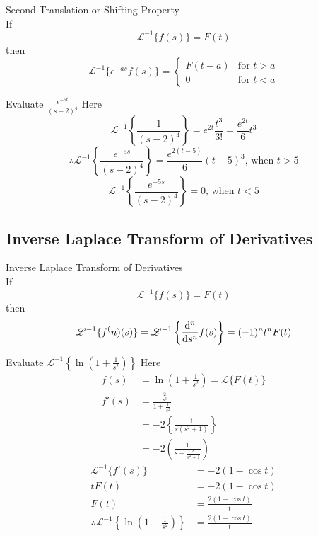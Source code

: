 \documentclass[12pt]{article}
\newcommand{\Lap}{\mathscr{L}}
\newcommand{\Lapinv}{\mathscr{L}^{-1}}
\begin{document}
\begin{theorem}{Second Translation or Shifting Property}{}
    \\If \[
        \Lapinv \{ f(s) \} = F(t)
    \] then \[
        \Lapinv \{ e^{-as}f(s) \} = 
        \begin{cases}
            F(t-a) & \text{for } t > a \\
            0 & \text{for } t < a
        \end{cases}
    \]
\end{theorem}

\begin{example}{Evaluate $\displaystyle \frac{e^{-5t}}{(s-2)^4}$}{}
    Here \[
        \Lapinv \left\{ \frac{1}{(s-2)^4} \right\} = e^{2t}\frac{t^3}{3!} = \frac{e^{2t}}{6} t^3
    \] \[
        \therefore \Lapinv \left\{ \frac{e^{-5s}}{(s-2)^4} \right\} = \frac{e^{2(t-5)}}{6} (t-5)^3 \text{, when } t > 5
    \] \[
        \Lapinv \left\{ \frac{e^{-5s}}{(s-2)^4} \right\} = 0 \text{, when } t < 5
    \]
\end{example}


\subsection{Inverse Laplace Transform of Derivatives}

\begin{theorem}{Inverse Laplace Transform of Derivatives}{}
    \\If \[
        \Lapinv \{ f(s) \} = F(t)
    \] then \[
        \Lapinv \{ f^(n)(s) \} = \Lapinv \left\{ \dv[n]{s} f(s) \right\} = (-1)^n t^n F(t)
    \]
\end{theorem}

\begin{example}{Evaluate $\displaystyle \Lapinv \left\{ \ln{\left( 1+\frac{1}{s^2} \right) } \right\}$}{}
    Here
    \begin{align*}
        f(s) &= \ln{\left( 1 + \frac{1}{s^2} \right) } = \Lap \{ F(t) \} \\
        f'(s) &= \frac{-\frac{2}{s^3}}{1+\frac{1}{s^2}} \\
        &= -2 \left\{ \frac{1}{s(s^2+1)} \right\} \\
        &= -2 \left( \frac{1}{s - \frac{s}{s^2+1}} \right)
    \end{align*}
    \begin{align*}
        \Lapinv \{ f'(s) \} &= -2 (1-\cos{t}) \\
        t F(t) &= -2 (1-\cos{t}) \\
        F(t) &= \frac{2(1-\cos{t})}{t} \\
        \therefore \Lapinv \left\{ \ln{\left( 1 + \frac{1}{s^2} \right)} \right\} &= \frac{2(1-\cos{t})}{t}
    \end{align*}
\end{example}
\end{document}
